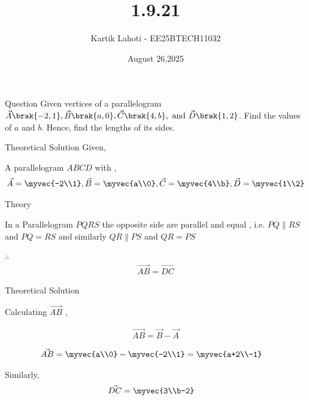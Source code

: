\documentclass{beamer}
\title %
{1.9.21}
\date{August 26,2025}
\author 
{Kartik Lahoti - EE25BTECH11032}
\begin{document}
\frame{\titlepage}
\begin{frame}{Question}
Given vertices of a parallelogram $\vec{A} \brak{-2,1} , \vec{B} \brak{a,0} , \vec{C} \brak{4,b}, \text{ and } \vec{D} \brak{1,2}$. Find the values of $a \text{ and } b $. Hence, find the lengths of its sides.
\end{frame}



\begin{frame}{Theoretical Solution}
Given,

A parallelogram $ABCD$ with , 
\begin{align}
    \vec{A} = \myvec{-2\\1} , \vec{B} = \myvec{a\\0} , \vec{C} = \myvec{4\\b} , \vec{D} = \myvec{1\\2}     
\end{align}

\end{frame}

\begin{frame}{Theory}

In a Parallelogram $PQRS$ the opposite side are parallel and equal , i.e. $PQ \parallel RS $ and $PQ = RS $ and similarly  $QR \parallel  PS $ and $ QR = PS $

$\therefore$  \begin{align}\vec{AB} = \vec{DC}\end{align}
\end{frame}
\begin{frame}{Theoretical Solution}

Calculating $\vec{AB}$ , 

\begin{align}
    \vec{AB} = \vec{B} - \vec{A}
\end{align}

\begin{align}
    \vec{AB} &= \myvec{a\\0} - \myvec{-2\\1} = \myvec{a+2\\-1}
\end{align}

Similarly, 
\begin{align}
    \vec{DC} &= \myvec{3\\b-2}
\end{align}

\end{frame}
\end{document}
